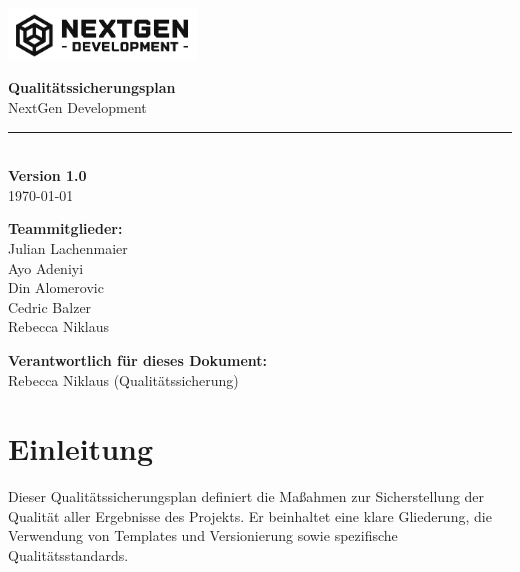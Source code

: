 \documentclass[a4paper,12pt]{article}
\begin{document}
\begin{titlepage}
    \begin{flushleft}
        \includegraphics[width=5cm]{logo.png}
    \end{flushleft}
    
    \vfill
    
    \begin{center}
        \Huge \textbf{Qualitätssicherungsplan} \\[1.0cm]
        \Large NextGen Development \\[0.5cm]
        \textcolor{gray}{\rule{0.8\textwidth}{0.4pt}} \\[0.5cm]
        \textbf{Version 1.0} \\[0.5cm] %
        \large \today \\[1.5cm]
    \end{center}
    
    \vfill

    \noindent
    \begin{minipage}[t]{0.45\textwidth}
        \textbf{Teammitglieder:}\\
        Julian Lachenmaier\\
        Ayo Adeniyi\\ 
        Din Alomerovic\\ 
        Cedric Balzer\\ 
        Rebecca Niklaus\\
    \end{minipage}%
    \hspace{1cm} 
    \begin{minipage}[t]{0.45\textwidth} 
        \textbf{Verantwortlich für dieses Dokument:}\\
        Rebecca Niklaus (Qualitätssicherung)\\
    \end{minipage}

\end{titlepage}

\tableofcontents
\newpage

\section{Einleitung}
Dieser Qualitätssicherungsplan definiert die Maßahmen zur Sicherstellung der Qualität aller Ergebnisse des Projekts. Er beinhaltet eine klare Gliederung, die Verwendung von Templates und Versionierung sowie spezifische Qualitätsstandards.
\newpage
\end{document}
